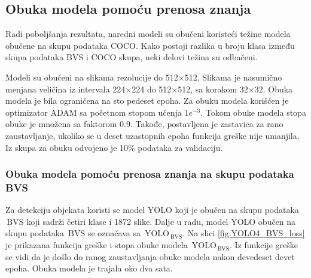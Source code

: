 \documentclass[12pt,oneside]{memoir}
\newcommand{\yolo}{\ensuremath{\,\textrm{YOLO}}}
\newcommand{\bvs}{\ensuremath{\,\textrm{BVS}}}
\begin{document}
\subsection{Obuka modela pomoću prenosa znanja}
Radi poboljšanja rezultata, naredni modeli su obučeni koristeći težine modela obučene na skupu podataka COCO. Kako postoji razlika u broju klasa između skupa podataka BVS i COCO skupa, neki delovi težina su odbačeni.

Modeli su obučeni na slikama rezolucije do 512$\times$512. Slikama je nasumično menjana veličina iz intervala 224$\times$224 do 512$\times$512, sa korakom 32$\times$32. Obuka modela je bila ograničena na sto pedeset epoha. Za obuku modela korišćen je optimizator ADAM sa početnom stopom učenja $1e^{-3}$. Tokom obuke modela stopa obuke je množena sa faktorom 0.9. Takođe, postavljena je zastavica za rano zaustavljanje, ukoliko se u deset uzastopnih epoha funkcija greške nije umanjila. Iz skupa za obuku odvojeno je 10\% podataka za validaciju. 


\subsubsection{Obuka modela pomoću prenosa znanja na skupu podataka BVS}

Za detekciju objekata koristi se model YOLO koji je obučen na skupu podataka \bvs{} koji sadrži četiri klase i 1872 slike. Dalje u radu, model YOLO obučen na skupu podataka \bvs{} se označava sa $\yolo_{\bvs}$. Na slici \ref{fig:YOLO4_BVS_loss} je prikazana funkcija greške i stopa obuke modela $\yolo_{\bvs}$. Iz funkcije greške se vidi da je došlo do ranog zaustavljanja obuke modela nakon devedeset devet epoha. Obuka modela je trajala oko dva sata.
\end{document}

